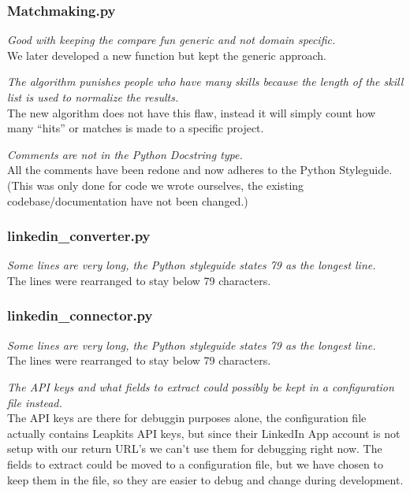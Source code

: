 \subsubsection{Matchmaking.py}
\begin{itemize*}
    \item \textit{Good with keeping the compare fun generic and not domain specific.}\\
          We later developed a new function but kept the generic approach.
    \item \textit{The algorithm punishes people who have many skills because the length of the skill list is used to normalize the results.}\\
          The new algorithm does not have this flaw, instead it will simply count how many ``hits'' or matches is made to a specific project.
    \item \textit{Comments are not in the Python Docstring type.}\\
          All the comments have been redone and now adheres to the Python Styleguide. (This was only done for code we wrote ourselves, the existing codebase/documentation have not been changed.)
\end{itemize*}


\subsubsection{linkedin\_converter.py}
\begin{itemize*}
    \item \textit{Some lines are very long, the Python styleguide states 79 as the longest line.}\\
          The lines were rearranged to stay below 79 characters.
\end{itemize*}

\subsubsection{linkedin\_connector.py}
\begin{itemize*}
    \item \textit{Some lines are very long, the Python styleguide states 79 as the longest line.}\\
          The lines were rearranged to stay below 79 characters.
    \item \textit{The API keys and what fields to extract could possibly be kept in a configuration file instead.}\\
          The API keys are there for debuggin purposes alone, the configuration file actually contains Leapkits API keys, but since their LinkedIn App account is not setup with our return URL's we can't use them for debugging right now.
          The fields to extract could be moved to a configuration file, but we have chosen to keep them in the file, so they are easier to debug and change during development.
\end{itemize*}
